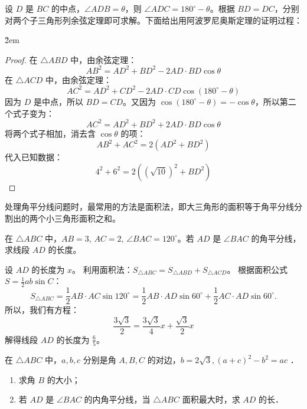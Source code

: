 \begin{solution}
    设 $D$ 是 $BC$ 的中点，$\angle ADB = \theta$，则 $\angle ADC = 180^\circ - \theta$。根据 $ BD = DC$，分别对两个子三角形列余弦定理即可求解。下面给出用阿波罗尼奥斯定理的证明过程：
\end{solution}

\v{2em}

\begin{proof}
    在 $\triangle ABD$ 中，由余弦定理：
    $$
        AB^2 = AD^2 + BD^2 - 2 AD \cdot BD \cos\theta
    $$
    在 $\triangle ACD$ 中，由余弦定理：
    $$
        AC^2 = AD^2 + CD^2 - 2 AD \cdot CD \cos(180^\circ - \theta)
    $$
    因为 $D$ 是中点，所以 $BD=CD$。又因为 $\cos(180^\circ - \theta) = -\cos\theta$，所以第二个式子变为：
    $$
        AC^2 = AD^2 + BD^2 + 2 AD \cdot BD \cos\theta
    $$
    将两个式子相加，消去含 $\cos\theta$ 的项：
    $$
        AB^2 + AC^2 = 2(AD^2 + BD^2)
    $$
    代入已知数据：
    $$
        4^2 + 6^2 = 2((\sqrt{10})^2 + BD^2)
    $$
\end{proof}
\vspace{2em}

\begin{theorem}[角平分线模型]
    处理角平分线问题时，最常用的方法是面积法，即大三角形的面积等于角平分线分割出的两个小三角形面积之和。
\end{theorem}

\begin{example}
    在 $\triangle ABC$ 中，$AB=3$, $AC=2$, $\angle BAC = 120^\circ$。若 $AD$ 是 $\angle BAC$ 的角平分线，求线段 $AD$ 的长度。
\end{example}
\begin{solution}
    设 $AD$ 的长度为 $x$。
    利用面积法：$S_{\triangle ABC} = S_{\triangle ABD} + S_{\triangle ACD}$。
    根据面积公式 $S = \frac{1}{2}ab \sin C$：
    $$
        S_{\triangle ABC} = \frac{1}{2} AB \cdot AC \sin 120^\circ = \frac{1}{2} AB \cdot AD \sin 60^\circ + \frac{1}{2} AC \cdot AD \sin 60^\circ.
    $$
    所以，我们有方程：
    $$
        \frac{3\sqrt{3}}{2} = \frac{3\sqrt{3}}{4}x + \frac{\sqrt{3}}{2}x
    $$
    解得线段 $AD$ 的长度为 $\frac{6}{5}$。
\end{solution}
\vspace{2em}

\begin{problem}
在 $\triangle A B C$ 中，$a, b, c$ 分别是角 $A, B, C$ 的对边，$b=2 \sqrt{3},(a+c)^2-b^2=a c$ ．
\begin{enumerate}
    \item 求角 $B$ 的大小；
    \item 若 $A D$ 是 $\angle B A C$ 的内角平分线，当 $\triangle A B C$ 面积最大时，求 $A D$ 的长．
\end{enumerate}
\end{problem}
\vspace{4em}

